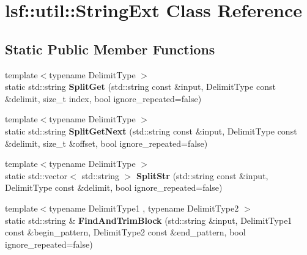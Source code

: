 \hypertarget{classlsf_1_1util_1_1StringExt}{
\section{lsf::util::StringExt Class Reference}
\label{classlsf_1_1util_1_1StringExt}
}
\subsection*{Static Public Member Functions}
\begin{DoxyCompactItemize}
\item 
\hypertarget{classlsf_1_1util_1_1StringExt_a650ba7529b3e89359fab336e504079d5}{
{\footnotesize template$<$typename DelimitType $>$ }\\static std::string {\bfseries SplitGet} (std::string const \&input, DelimitType const \&delimit, size\_\-t index, bool ignore\_\-repeated=false)}
\label{classlsf_1_1util_1_1StringExt_a650ba7529b3e89359fab336e504079d5}

\item 
\hypertarget{classlsf_1_1util_1_1StringExt_ac5ccfe5e5c6c7e0fafd789d311af8181}{
{\footnotesize template$<$typename DelimitType $>$ }\\static std::string {\bfseries SplitGetNext} (std::string const \&input, DelimitType const \&delimit, size\_\-t \&offset, bool ignore\_\-repeated=false)}
\label{classlsf_1_1util_1_1StringExt_ac5ccfe5e5c6c7e0fafd789d311af8181}

\item 
\hypertarget{classlsf_1_1util_1_1StringExt_ab4b108338c6be993b3dcffa747962e6d}{
{\footnotesize template$<$typename DelimitType $>$ }\\static std::vector$<$ std::string $>$ {\bfseries SplitStr} (std::string const \&input, DelimitType const \&delimit, bool ignore\_\-repeated=false)}
\label{classlsf_1_1util_1_1StringExt_ab4b108338c6be993b3dcffa747962e6d}

\item 
\hypertarget{classlsf_1_1util_1_1StringExt_abcdf3acdbb743e6429e000e24c2edb13}{
{\footnotesize template$<$typename DelimitType1 , typename DelimitType2 $>$ }\\static std::string \& {\bfseries FindAndTrimBlock} (std::string \&input, DelimitType1 const \&begin\_\-pattern, DelimitType2 const \&end\_\-pattern, bool ignore\_\-repeated=false)}
\label{classlsf_1_1util_1_1StringExt_abcdf3acdbb743e6429e000e24c2edb13}


\end{DoxyCompactItemize}

